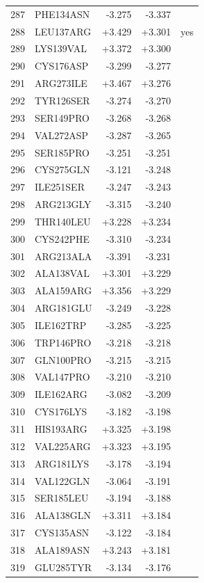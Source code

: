 \begin{longtable}{r l r r c}
287 & PHE134ASN & -3.275 & -3.337 &  \\
288 & LEU137ARG & +3.429 & +3.301 & yes \\
289 & LYS139VAL & +3.372 & +3.300 &  \\
290 & CYS176ASP & -3.299 & -3.277 &  \\
291 & ARG273ILE & +3.467 & +3.276 &  \\
292 & TYR126SER & -3.274 & -3.270 &  \\
293 & SER149PRO & -3.268 & -3.268 &  \\
294 & VAL272ASP & -3.287 & -3.265 &  \\
295 & SER185PRO & -3.251 & -3.251 &  \\
296 & CYS275GLN & -3.121 & -3.248 &  \\
297 & ILE251SER & -3.247 & -3.243 &  \\
298 & ARG213GLY & -3.315 & -3.240 &  \\
299 & THR140LEU & +3.228 & +3.234 &  \\
300 & CYS242PHE & -3.310 & -3.234 &  \\
301 & ARG213ALA & -3.391 & -3.231 &  \\
302 & ALA138VAL & +3.301 & +3.229 &  \\
303 & ALA159ARG & +3.356 & +3.229 &  \\
304 & ARG181GLU & -3.249 & -3.228 &  \\
305 & ILE162TRP & -3.285 & -3.225 &  \\
306 & TRP146PRO & -3.218 & -3.218 &  \\
307 & GLN100PRO & -3.215 & -3.215 &  \\
308 & VAL147PRO & -3.210 & -3.210 &  \\
309 & ILE162ARG & -3.082 & -3.209 &  \\
310 & CYS176LYS & -3.182 & -3.198 &  \\
311 & HIS193ARG & +3.325 & +3.198 &  \\
312 & VAL225ARG & +3.323 & +3.195 &  \\
313 & ARG181LYS & -3.178 & -3.194 &  \\
314 & VAL122GLN & -3.064 & -3.191 &  \\
315 & SER185LEU & -3.194 & -3.188 &  \\
316 & ALA138GLN & +3.311 & +3.184 &  \\
317 & CYS135ASN & -3.122 & -3.184 &  \\
318 & ALA189ASN & +3.243 & +3.181 &  \\
319 & GLU285TYR & -3.134 & -3.176 &  \\

\end{longtable}
